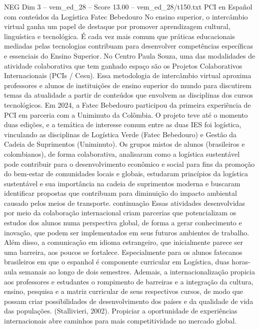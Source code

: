 \begin{textsample}{NEG Dim 3 – vem\_ed\_28 – Score 13.00 – vem\_ed\_28/t150.txt}  \label{ex:f3_neg_179}
PCI en Español com conteúdos da Logística Fatec Bebedouro No ensino superior, o intercâmbio virtual ganha um papel de destaque por promover aprendizagem cultural, linguística e tecnológica.
É cada vez mais comum que práticas educacionais mediadas pelas tecnologias contribuam para desenvolver competências específicas e essenciais do Ensino Superior.
No Centro Paula Souza, uma das modalidades de atividade colaborativa que tem ganhado espaço são os Projetos Colaborativos Internacionais (PCIs / Cesu).
Essa metodologia de intercâmbio virtual aproxima professores e alunos de instituições de ensino superior do mundo para discutirem temas da atualidade a partir de conteúdos que envolvem as disciplinas dos cursos tecnológicos.
Em 2024, a Fatec Bebedouro participou da primeira experiência de PCI em parceria com a Uniminuto da Colômbia.
O projeto teve até o momento duas edições, e a temática de interesse comum entre as duas IES foi logística, vinculando as disciplinas de Logística Verde (Fatec Bebedouro) e Gestão da Cadeia de Suprimentos (Uniminuto).
Os grupos mistos de alunos (brasileiros e colombianos), de forma colaborativa, analisaram como a logística sustentável pode contribuir para o desenvolvimento econômico e social para fins da promoção do bem-estar de comunidades locais e globais, estudaram princípios da logística sustentável e sua importância na cadeia de suprimentos moderna e buscaram identificar propostas que contribuam para diminuição do impacto ambiental causado pelos meios de transporte. continuação Essas atividades desenvolvidas por meio da colaboração internacional criam parcerias que potencializam os estudos dos alunos numa perspectiva global, de forma a gerar conhecimento e inovação, que podem ser implementados em seus futuros ambientes de trabalho.
Além disso, a comunicação em idioma estrangeiro, que inicialmente parece ser uma barreira, aos poucos se fortalece.
Especialmente para os alunos fatecanos brasileiros em que o espanhol é componente curricular em Logística, duas horas-aula semanais ao longo de dois semestres.
Ademais, a internacionalização propicia aos professores e estudantes o rompimento de barreiras e a integração da cultura, ensino, pesquisa e a matriz curricular de seus respectivos cursos, de modo que possam criar possibilidades de desenvolvimento dos países e da qualidade de vida das populações. (Stallivieri, 2002).
Propiciar a oportunidade de experiências internacionais abre caminhos para mais competitividade no mercado global.

\end{textsample}
